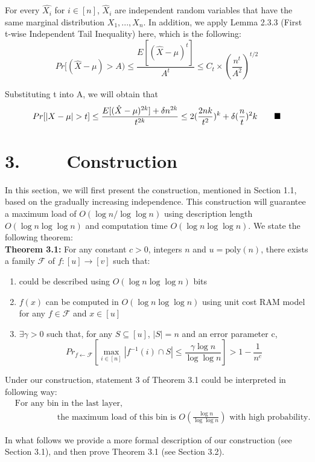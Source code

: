 \documentclass[a4paper, english]{paper}
\begin{document}
	 For every $\hat{X_i}$ for $i \in [n]$, $\hat{X}_i$ are independent random variables that have the same marginal distribution $X_1, ..., X_n$. In addition, we apply Lemma 2.3.3 (First t-wise Independent Tail Inequality) here, which is the following: 
	 $$ Pr[(\hat{X}-\mu) > A) \le \frac{E[(\hat{X}-\mu)^t]}{A^t} \le C_t \times (\frac{n^t}{A^2})^{t/2} $$ 
	 \par Substituting t into A, we will obtain that
	 $$ Pr[|X - \mu| > t] \le \frac{E[(\hat{X}-\mu)^{2k}] + \delta n^{2k}}{t^{2k}} \le 2(\frac{2nk}{t^2})^k + \delta (\frac{n}{t})^2k \qquad \hfill\blacksquare$$ 
		
	\section{3. $\qquad$ Construction}
\quad In this section, we will first present the construction, mentioned in Section 1.1, based on the gradually increasing independence. This construction will guarantee a maximum load of  $O(\log n/\log\log n)$ using description length $O(\log n\log\log n)$ and computation time $O(\log n\log\log n)$. We state the following theorem: \\
	
	\noindent\textbf{Theorem 3.1:} For any constant $c>0$, integers $n$ and $u=\text{poly}(n)$, there exists a family  $\mathscr{F}$ of $f:[u]\rightarrow[v]$ such that:
	\begin{enumerate}
	\item could be described using $O(\log n \log\log n)$ bits
	\item $f(x)$ can be computed in $O(\log n \log\log n)$ using unit cost RAM model for any $f\in \mathscr{F}$ and $x\in[u]$
	\item $\exists \gamma>0$ such that, for any $S\subseteq[u]$, $|S|=n$ and an error parameter c,
		$${Pr}_{f\leftarrow \mathscr{F}}\left[\max_{i\in[n]}|f^{-1}(i) \cap S|\le \frac{\gamma\log n}{\log\log n}\right]> 1-\frac1{n^c}$$
	\end{enumerate}\par
	Under our construction, statement 3 of Theorem 3.1 could be interpreted in following way:
	\begin{align*}
	&\text{For any bin in the last layer,}\\
	& \qquad\qquad\quad\text{the maximum load of this bin is } O(\frac{\log n}{\log\log n}) \text{ with high probability.}
	\end{align*}\par
	In what follows we provide a more formal description of our construction (see Section 3.1), and then prove Theorem 3.1 (see Section 3.2).
	
\end{document}
